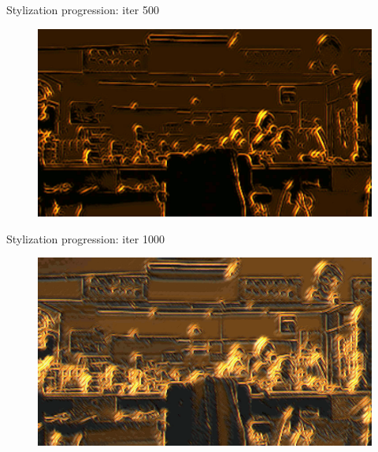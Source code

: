 \documentclass{beamer}
\begin{document}
    \begin{frame}{Stylization progression: iter 500}

        \begin{figure}
            \includegraphics[width=\textwidth]{progression-1}
        \end{figure}

    \end{frame}

    \begin{frame}{Stylization progression: iter 1000}

        \begin{figure}
            \includegraphics[width=\textwidth]{progression-2}
        \end{figure}

    \end{frame}
\end{document}
